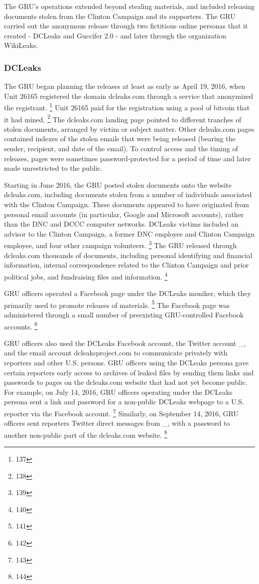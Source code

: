 The GRU's operations extended beyond stealing materials, and included releasing documents stolen from the Clinton Campaign and its supporters.
The GRU carried out the anonymous release through two fictitious online personas that it created - DCLeaks and Guccifer 2.0 - and later through the organization WikiLeaks.

\subsubsection{DCLeaks}

The GRU began planning the releases at least as early as April 19, 2016, when Unit 26165 registered the domain dcleaks.com through a service that anonymized the registrant.%
\footnote{137}
Unit 26165 paid for the registration using a pool of bitcoin that it had mined.%
\footnote{138}
The dcleaks.com landing page pointed to different tranches of stolen documents, arranged by victim or subject matter.
Other dcleaks.com pages contained indexes of the stolen emails that were being released (bearing the sender, recipient, and date of the email).
To control access and the timing of releases, pages were sometimes password-protected for a period of time and later made unrestricted to the public.

Starting in June 2016, the GRU posted stolen documents onto the website dcleaks.com, including documents stolen from a number of individuals associated with the Clinton Campaign.
These documents appeared to have originated from personal email accounts (in particular, Google and Microsoft accounts), rather than the DNC and DCCC computer networks.
DCLeaks victims included an advisor to the Clinton Campaign, a former DNC employee and Clinton Campaign employee, and four other campaign volunteers.%
\footnote{139}
The GRU released through dcleaks.com thousands of documents, including personal identifying and financial information, internal correspondence related to the Clinton Campaign and prior political jobs, and fundraising files and information.%
\footnote{140}

GRU officers operated a Facebook page under the DCLeaks moniker, which they primarily used to promote releases of materials.%
\footnote{141}
The Facebook page was administered through a small number of preexisting GRU-controlled Facebook accounts.%
\footnote{142}

GRU officers also used the DCLeaks Facebook account, the Twitter account \@dcleaks\_, and the email account dcleaksproject\@gmail.com to communicate privately with reporters and other U.S. persons.
GRU officers using the DCLeaks persona gave certain reporters early access to archives of leaked files by sending them links and passwords to pages on the dcleaks.com website that had not yet become public.
For example, on July 14, 2016, GRU officers operating under the DCLeaks persona sent a link and password for a non-public DCLeaks webpage to a U.S. reporter via the Facebook account.%
\footnote{143}
Similarly, on September 14, 2016, GRU officers sent reporters Twitter direct messages from \@dcleaks\_, with a password to another non-public part of the dcleaks.com website.%
\footnote{144}

